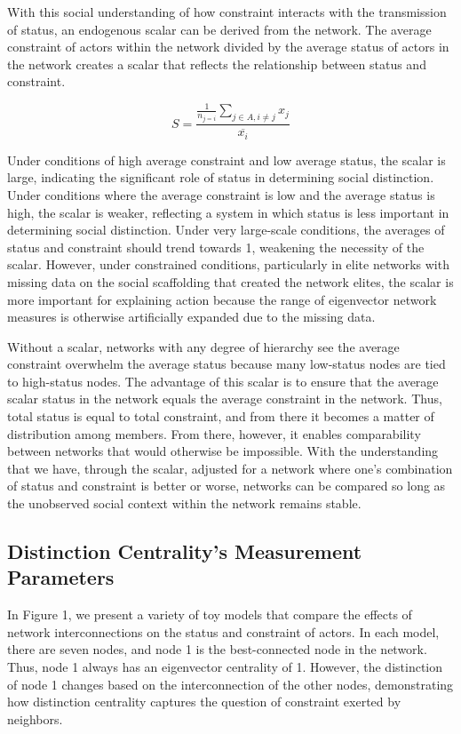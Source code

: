 \documentclass[12pt]{article}
\begin{document}
With this social understanding of how constraint interacts with the transmission of status, an endogenous scalar can be derived from the network. The average constraint of actors within the network divided by the average status of actors in the network creates a scalar that reflects the relationship between status and constraint. 

\[S=\frac{\frac{1}{n_{j=i}}\sum_{{j}\in{A},i\neq{j}}x_{j}}{\overline{x_i}} \]

Under conditions of high average constraint and low average status, the scalar is large, indicating the significant role of status in determining social distinction. Under conditions where the average constraint is low and the average status is high, the scalar is weaker, reflecting a system in which status is less important in determining social distinction. Under very large-scale conditions, the averages of status and constraint should trend towards 1, weakening the necessity of the scalar. However, under constrained conditions, particularly in elite networks with missing data on the social scaffolding that created the network elites, the scalar is more important for explaining action because the range of eigenvector network measures is otherwise artificially expanded due to the missing data.  

Without a scalar, networks with any degree of hierarchy see the average constraint overwhelm the average status because many low-status nodes are tied to high-status nodes. The advantage of this scalar is to ensure that the average scalar status in the network equals the average constraint in the network. Thus, total status is equal to total constraint, and from there it becomes a matter of distribution among members. From there, however, it enables comparability between networks that would otherwise be impossible. With the understanding that we have, through the scalar, adjusted for a network where one's combination of status and constraint is better or worse, networks can be compared so long as the unobserved social context within the network remains stable. 

\subsection{Distinction Centrality's Measurement Parameters}
In Figure 1, we present a variety of toy models that compare the effects of network interconnections on the status and constraint of actors. In each model, there are seven nodes, and node 1 is the best-connected node in the network. Thus, node 1 always has an eigenvector centrality of 1. However, the distinction of node 1 changes based on the interconnection of the other nodes, demonstrating how distinction centrality captures the question of constraint exerted by neighbors. 
\end{document}
